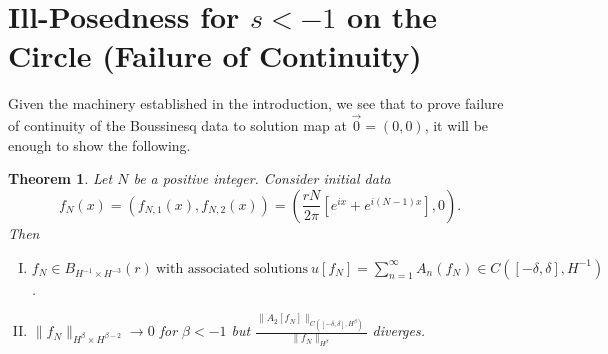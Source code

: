 \documentclass[12pt,reqno]{amsart}
\numberwithin{equation}{section}  %
\newtheorem{theorem}{Theorem}[section]
\begin{document}
\section{Ill-Posedness for $s < -1$ on the Circle (Failure of Continuity)} 
\label{sec:pf-ill-pos}
Given the machinery established in the introduction, we see that to prove failure of continuity of the Boussinesq data to solution map at $\vec{0} =
(0, 0)$, it will be enough to show the
following.
%
%
%
%
%
%
%
%
%
%
%
\begin{theorem}
  Let $N$ be a positive integer. Consider initial data $$f_{N}(x) =
  (f_{N,1}(x), f_{N,2}(x)) = \left ( \frac{r N}{2 \pi}\left[ e^{ix} + e^{i(N-1)x} \right], 0
  \right ).$$ Then 
    \begin{enumerate}[(I)]
      \item{$ f_{N} \in B_{H^{-1} \times H^{-3}}(r) \ \text{with associated
    solutions}
    \ u[f_{N}] = \sum_{n=1}^{\infty} A_{n}(f_{N}) \in C([-\delta, \delta],
    H^{-1})$}.
    \\
  \item
    $\|f_{N}\|_{H^{\beta} \times H^{\beta-2}} \to 0$ for $\beta < -1$ but 
    $ \displaystyle \frac{\|A_{2}[f_{N}]\|_{C( [-\delta, \delta], H^{\beta})}}{\| f_{N}
    \|_{H^{\beta}}}$ diverges.
\end{enumerate}
\label{thm:ill-pos}
\end{theorem}
%
%
%
%
%
%
%
%
%
%
%
\end{document}
